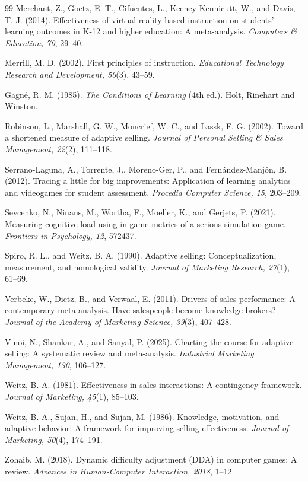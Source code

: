 \documentclass[12pt]{report}
\begin{document}
\begin{thebibliography}{99}
Merchant, Z., Goetz, E. T., Cifuentes, L., Keeney-Kennicutt, W., and Davis, T. J. (2014).
Effectiveness of virtual reality-based instruction on students' learning outcomes in K-12 and higher education: A meta-analysis.
\textit{Computers \& Education, 70}, 29--40.

Merrill, M. D. (2002).
First principles of instruction.
\textit{Educational Technology Research and Development, 50}(3), 43--59.

Gagn\'{e}, R. M. (1985).
\textit{The Conditions of Learning} (4th ed.).
Holt, Rinehart and Winston.

Robinson, L., Marshall, G. W., Moncrief, W. C., and Lassk, F. G. (2002).
Toward a shortened measure of adaptive selling.
\textit{Journal of Personal Selling \& Sales Management, 22}(2), 111--118.

Serrano-Laguna, A., Torrente, J., Moreno-Ger, P., and Fernández-Manjón, B. (2012).
Tracing a little for big improvements: Application of learning analytics and videogames for student assessment.
\textit{Procedia Computer Science, 15}, 203--209.

Sevcenko, N., Ninaus, M., Wortha, F., Moeller, K., and Gerjets, P. (2021).
Measuring cognitive load using in-game metrics of a serious simulation game.
\textit{Frontiers in Psychology, 12}, 572437.

Spiro, R. L., and Weitz, B. A. (1990).
Adaptive selling: Conceptualization, measurement, and nomological validity.
\textit{Journal of Marketing Research, 27}(1), 61--69.

Verbeke, W., Dietz, B., and Verwaal, E. (2011).
Drivers of sales performance: A contemporary meta-analysis. Have salespeople become knowledge brokers?
\textit{Journal of the Academy of Marketing Science, 39}(3), 407--428.

Vinoi, N., Shankar, A., and Sanyal, P. (2025).
Charting the course for adaptive selling: A systematic review and meta-analysis.
\textit{Industrial Marketing Management, 130}, 106--127.

Weitz, B. A. (1981).
Effectiveness in sales interactions: A contingency framework.
\textit{Journal of Marketing, 45}(1), 85--103.

Weitz, B. A., Sujan, H., and Sujan, M. (1986).
Knowledge, motivation, and adaptive behavior: A framework for improving selling effectiveness.
\textit{Journal of Marketing, 50}(4), 174--191.

Zohaib, M. (2018).
Dynamic difficulty adjustment (DDA) in computer games: A review.
\textit{Advances in Human-Computer Interaction, 2018}, 1--12.

\end{thebibliography}
\end{document}
